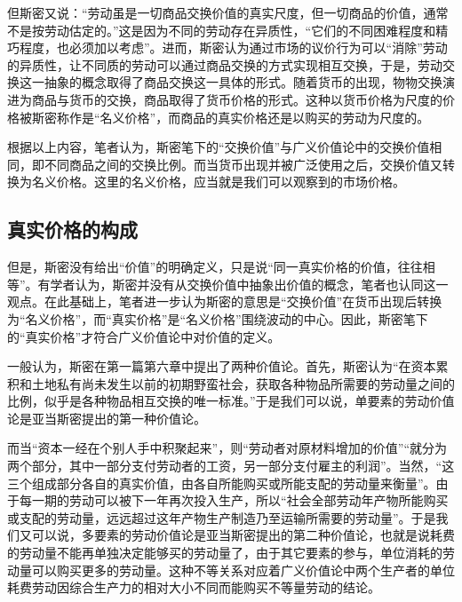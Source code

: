 但斯密又说：“劳动虽是一切商品交换价值的真实尺度，但一切商品的价值，通常不是按劳动估定的。”\cite[26]{YaDang*SiMiGuoFuLun2015}这是因为不同的劳动存在异质性，“它们的不同困难程度和精巧程度，也必须加以考虑”\cite[26]{YaDang*SiMiGuoFuLun2015}。进而，斯密认为通过市场的议价行为可以“消除”劳动的异质性，让不同质的劳动可以通过商品交换的方式实现相互交换，于是，劳动交换这一抽象的概念取得了商品交换这一具体的形式\cite[26]{YaDang*SiMiGuoFuLun2015}。随着货币的出现，物物交换演进为商品与货币的交换，商品取得了货币价格的形式。这种以货币价格为尺度的价格被斯密称作是“名义价格”，而商品的真实价格还是以购买的劳动为尺度的\cite[28]{YaDang*SiMiGuoFuLun2015}。

根据以上内容，笔者认为，斯密笔下的“交换价值”与广义价值论中的交换价值相同，即不同商品之间的交换比例。而当货币出现并被广泛使用之后，交换价值又转换为名义价格。这里的名义价格，应当就是我们可以观察到的市场价格\cite[293]{YueSeFu*XiongBiTeJingJiFenXiShiDi1Juan2017}。

\subsection{真实价格的构成}

但是，斯密没有给出“价值”的明确定义，只是说“同一真实价格的价值，往往相等”\cite[28]{YaDang*SiMiGuoFuLun2015}。有学者认为，斯密并没有从交换价值中抽象出价值的概念\cite[71]{ChenDaiSunCongGuDianJingJiXuePaiDaoMaKeSiRuoGanZhuYaoXueShuoFaZhanLueLun2014}，笔者也认同这一观点。在此基础上，笔者进一步认为斯密的意思是“交换价值”在货币出现后转换为“名义价格”，而“真实价格”是“名义价格”围绕波动的中心\cite[52]{YaDang*SiMiGuoFuLun2015}。因此，斯密笔下的“真实价格”才符合广义价值论中对价值的定义。

一般认为，斯密在第一篇第六章中提出了两种价值论\cite[97]{YanZhiJieXiFangJingJiXueShuoShiJiaoChengDiErBan2013}\cite[126]{CaiJiMingCongGuDianZhengZhiJingJiXueDaoZhongGuoTeSeSheHuiZhuYiZhengZhiJingJiXueJiYuZhongGuoShiJiaoDeZhengZhiJingJiXueYanBianShangCe2023}。首先，斯密认为“在资本累积和土地私有尚未发生以前的初期野蛮社会，获取各种物品所需要的劳动量之间的比例，似乎是各种物品相互交换的唯一标准。”\cite[41]{YaDang*SiMiGuoFuLun2015}于是我们可以说，单要素的劳动价值论是亚当斯密提出的第一种价值论。

而当“资本一经在个别人手中积聚起来”，则“劳动者对原材料增加的价值”“就分为两个部分，其中一部分支付劳动者的工资，另一部分支付雇主的利润”\cite[42]{YaDang*SiMiGuoFuLun2015}。当然，“这三个组成部分各自的真实价值，由各自所能购买或所能支配的劳动量来衡量”\cite[43-44]{YaDang*SiMiGuoFuLun2015}。由于每一期的劳动可以被下一年再次投入生产，所以“社会全部劳动年产物所能购买或支配的劳动量，远远超过这年产物生产制造乃至运输所需要的劳动量”\cite[48]{YaDang*SiMiGuoFuLun2015}。于是我们又可以说，多要素的劳动价值论是亚当斯密提出的第二种价值论，也就是说耗费的劳动量不能再单独决定能够买的劳动量了，由于其它要素的参与，单位消耗的劳动量可以购买更多的劳动量\cite[138]{CaiJiMingCongGuDianDaoXianDaiZhengZhiJingJiXueGaiNianDeYanBianJianPingXinZhengZhiJingJiXueDeFaZhan2012}。这种不等关系对应着广义价值论中两个生产者的单位耗费劳动因综合生产力的相对大小不同而能购买不等量劳动的结论\cite[294]{CaiJiMingCongGuDianZhengZhiJingJiXueDaoZhongGuoTeSeSheHuiZhuYiZhengZhiJingJiXueJiYuZhongGuoShiJiaoDeZhengZhiJingJiXueYanBianShangCe2023}。

